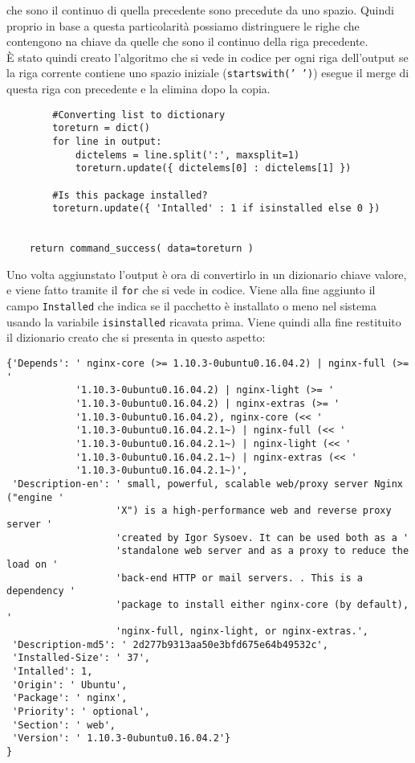 \documentclass[11pt]{article}
\begin{document}
che sono il continuo di quella precedente sono precedute da uno spazio. Quindi proprio in base a questa particolarità possiamo
distringuere le righe che contengono na chiave da quelle che sono il continuo della riga precedente.\\
È stato quindi creato l'algoritmo che si vede in codice per ogni riga dell'output se la riga corrente contiene uno spazio
iniziale (\texttt{startswith(' ')}) esegue il merge di questa riga con precedente e la elimina dopo la copia.
\begin{lstlisting}
        #Converting list to dictionary
        toreturn = dict()
        for line in output:
            dictelems = line.split(':', maxsplit=1)
            toreturn.update({ dictelems[0] : dictelems[1] })

        #Is this package installed?
        toreturn.update({ 'Intalled' : 1 if isinstalled else 0 })


    return command_success( data=toreturn )
\end{lstlisting}
Uno volta aggiunstato l'output è ora di convertirlo in un dizionario chiave valore, e viene fatto tramite il \texttt{for}
che si vede in codice. Viene alla fine aggiunto il campo \texttt{Installed} che indica se il pacchetto è installato
o meno nel sistema usando la variabile \texttt{isinstalled} ricavata prima. Viene quindi alla fine restituito
il dizionario creato che si presenta in questo aspetto:
\begin{lstlisting}
{'Depends': ' nginx-core (>= 1.10.3-0ubuntu0.16.04.2) | nginx-full (>= '
            '1.10.3-0ubuntu0.16.04.2) | nginx-light (>= '
            '1.10.3-0ubuntu0.16.04.2) | nginx-extras (>= '
            '1.10.3-0ubuntu0.16.04.2), nginx-core (<< '
            '1.10.3-0ubuntu0.16.04.2.1~) | nginx-full (<< '
            '1.10.3-0ubuntu0.16.04.2.1~) | nginx-light (<< '
            '1.10.3-0ubuntu0.16.04.2.1~) | nginx-extras (<< '
            '1.10.3-0ubuntu0.16.04.2.1~)',
 'Description-en': ' small, powerful, scalable web/proxy server Nginx ("engine '
                   'X") is a high-performance web and reverse proxy server '
                   'created by Igor Sysoev. It can be used both as a '
                   'standalone web server and as a proxy to reduce the load on '
                   'back-end HTTP or mail servers. . This is a dependency '
                   'package to install either nginx-core (by default), '
                   'nginx-full, nginx-light, or nginx-extras.',
 'Description-md5': ' 2d277b9313aa50e3bfd675e64b49532c',
 'Installed-Size': ' 37',
 'Intalled': 1,
 'Origin': ' Ubuntu',
 'Package': ' nginx',
 'Priority': ' optional',
 'Section': ' web',
 'Version': ' 1.10.3-0ubuntu0.16.04.2'}
}
\end{lstlisting}
\end{document}
